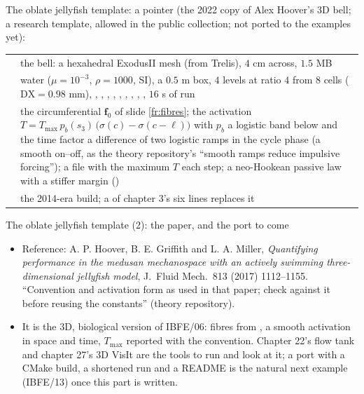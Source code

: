 \documentclass[aspectratio=169,11pt]{beamer}
\begin{document}
\begin{frame}[fragile]{The oblate jellyfish template: a pointer}
\label{fr:jellyfish}
\footnotesize
{} (the 2022 copy of Alex Hoover's 3D bell; a research template, allowed in the public collection; not ported to the examples yet):
\begin{tabular}{@{}L{0.22\textwidth}L{0.70\textwidth}@{}}
\toprule
{} & the bell: a hexahedral ExodusII mesh (from Trelis), $4$ cm across, $1.5$ MB \\
 & water ($\mu = 10^{-3}$, $\rho = 1000$, SI), a $0.5$ m box, $4$ levels at ratio $4$ from $8$ cells ($\mathrm{DX} = 0.98$ mm), , , , , , , , , , $16$ s of run \\
 & the circumferential $\mathbf{f}_0$ of slide \ref{fr:fibres}; the activation $T = T_{\max}\,p_b(s_3)\,\bigl(\sigma(c) - \sigma(c - \ell)\bigr)$ with $p_b$ a logistic band below  and the time factor a difference of two logistic ramps in the cycle phase (a smooth on--off, as the theory repository's ``smooth ramps reduce impulsive forcing''); a  file with the maximum $T$ each step; a neo-Hookean passive law with a stiffer margin () \\
 & the 2014-era build; a  of chapter 3's six lines replaces it \\
\bottomrule
\end{tabular}

\end{frame}

\begin{frame}{The oblate jellyfish template (2): the paper, and the port to come}
\label{fr:jellyfish2}
\footnotesize
\begin{itemize}
  \item Reference: A. P. Hoover, B. E. Griffith and L. A. Miller, \emph{Quantifying performance in the medusan mechanospace with an actively swimming three-dimensional jellyfish model}, J.\ Fluid Mech.\ 813 (2017) 1112--1155. ``Convention and activation form as used in that paper; check against it before reusing the constants'' (theory repository).
  \item It is the 3D, biological version of IBFE/06: fibres from , a smooth activation in space and time, $T_{\max}$ reported with the convention. Chapter 22's flow tank and chapter 27's 3D VisIt are the tools to run and look at it; a port with a CMake build, a shortened run and a README is the natural next example (IBFE/13) once this part is written.
\end{itemize}
\end{frame}
\end{document}
